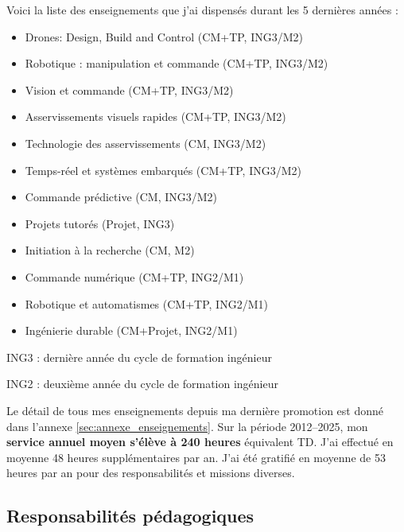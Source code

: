 \documentclass[a4paper,12pt]{article}
\begin{document}

Voici la liste des enseignements que j'ai dispensés durant les 5 dernières années :
\begin{itemize}
    \item Drones: Design, Build and Control (CM+TP, ING3/M2)
    \item Robotique : manipulation et commande (CM+TP, ING3/M2)
    \item Vision et commande (CM+TP, ING3/M2)
    \item Asservissements visuels rapides (CM+TP, ING3/M2)
    \item Technologie des asservissements (CM, ING3/M2)
    \item Temps-réel et systèmes embarqués (CM+TP, ING3/M2)
    \item Commande prédictive (CM, ING3/M2)
    \item Projets tutorés (Projet, ING3)
    \item Initiation à la recherche (CM, M2)
    \item Commande numérique (CM+TP, ING2/M1)
    \item Robotique et automatismes (CM+TP, ING2/M1)
    \item Ingénierie durable (CM+Projet, ING2/M1)
\end{itemize}
{\small

ING3 : dernière année du cycle de formation ingénieur

ING2 : deuxième année du cycle de formation ingénieur
}

Le détail de tous mes enseignements depuis ma dernière promotion est donné dans l'annexe \ref{sec:annexe_enseignements}. Sur la période 2012--2025, mon \textbf{service annuel moyen s'élève à 240 heures} équivalent TD. J'ai effectué en moyenne 48 heures supplémentaires par an. J'ai été gratifié en moyenne de 53 heures par an pour des responsabilités et missions diverses. 


\subsection{Responsabilités pédagogiques}
\end{document}
